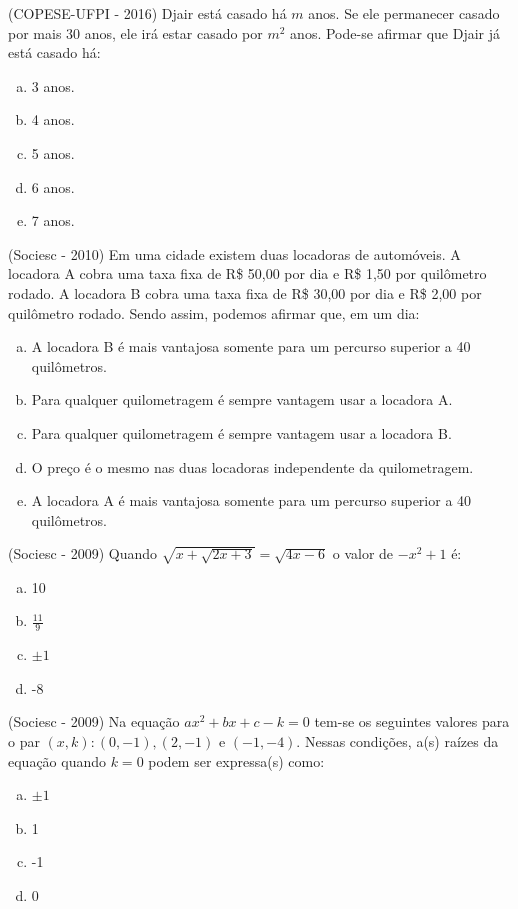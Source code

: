  \begin{exer}
 (COPESE-UFPI - 2016) Djair está casado há $m$ anos. Se ele permanecer casado por mais $30$ anos, ele irá estar casado por $m^2$ anos. Pode-se afirmar que Djair já está casado há:
 \begin{multicols}{5}
 \begin{enumerate}[a)]
 \item 3 anos.
 \item 4 anos.
 \item 5 anos.
 \item 6 anos.
 \item 7 anos.
 \end{enumerate}
 \end{multicols}
 \end{exer}

 \begin{exer}
 (Sociesc - 2010) Em uma cidade existem duas locadoras de automóveis. A locadora A cobra uma taxa fixa de R\$ 50,00 por dia e R\$ 1,50 por quilômetro rodado. A locadora B cobra uma taxa fixa de R\$ 30,00 por dia e R\$ 2,00 por quilômetro rodado. Sendo assim, podemos afirmar que, em um dia:
  \begin{enumerate}[a)]
  \item A locadora B é mais vantajosa somente para um percurso superior a 40 quilômetros.
  \item Para qualquer quilometragem é sempre vantagem usar a locadora A.
  \item Para qualquer quilometragem é sempre vantagem usar a locadora B.
  \item O preço é o mesmo nas duas locadoras independente da quilometragem.
  \item A locadora A é mais vantajosa somente para um percurso superior a 40 quilômetros.
 \end{enumerate}
 \end{exer}

 \begin{exer}
 (Sociesc - 2009) Quando $\sqrt{x + \sqrt{2x+3}}= \sqrt{4x-6}$ o valor de $-x^2+1$ é:
 \begin{enumerate}[a)]
  \item 10
  \item $\frac{11}{9}$
  \item $\pm 1$
  \item -8
 \end{enumerate}
 \end{exer}

 \begin{exer}
  (Sociesc - 2009) Na equação $ax^2+bx+c-k=0$ tem-se os seguintes valores para o par $(x, k): (0,-1), (2,-1) \text{ e } (-1,-4)$. Nessas condições, a(s) raízes da equação quando $k=0$ podem ser expressa(s) como:
 \begin{enumerate}[a)]
  \item $\pm 1$
  \item 1
  \item -1
  \item 0
 \end{enumerate}
 \end{exer}

